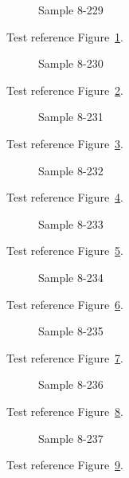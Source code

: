 \begin{figure}[tbhp]
\caption{Sample 8-229}
\label{fig:sample-8-229}
\end{figure}

Test reference Figure~\ref{fig:sample-8-229}.

\begin{figure}[tbhp]
\caption{Sample 8-230}
\label{fig:sample-8-230}
\end{figure}

Test reference Figure~\ref{fig:sample-8-230}.

\begin{figure}[tbhp]
\caption{Sample 8-231}
\label{fig:sample-8-231}
\end{figure}

Test reference Figure~\ref{fig:sample-8-231}.

\begin{figure}[tbhp]
\caption{Sample 8-232}
\label{fig:sample-8-232}
\end{figure}

Test reference Figure~\ref{fig:sample-8-232}.

\begin{figure}[tbhp]
\caption{Sample 8-233}
\label{fig:sample-8-233}
\end{figure}

Test reference Figure~\ref{fig:sample-8-233}.

\begin{figure}[tbhp]
\caption{Sample 8-234}
\label{fig:sample-8-234}
\end{figure}

Test reference Figure~\ref{fig:sample-8-234}.

\begin{figure}[tbhp]
\caption{Sample 8-235}
\label{fig:sample-8-235}
\end{figure}

Test reference Figure~\ref{fig:sample-8-235}.

\begin{figure}[tbhp]
\caption{Sample 8-236}
\label{fig:sample-8-236}
\end{figure}

Test reference Figure~\ref{fig:sample-8-236}.

\begin{figure}[tbhp]
\caption{Sample 8-237}
\label{fig:sample-8-237}
\end{figure}

Test reference Figure~\ref{fig:sample-8-237}.

